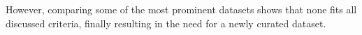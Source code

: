 However, comparing some of the most prominent datasets shows that none fits all discussed criteria, finally resulting in the need for a newly curated dataset.
\begin{table}[H]
\centering
\label{tab
:dataset_comparison}
\end{table}
